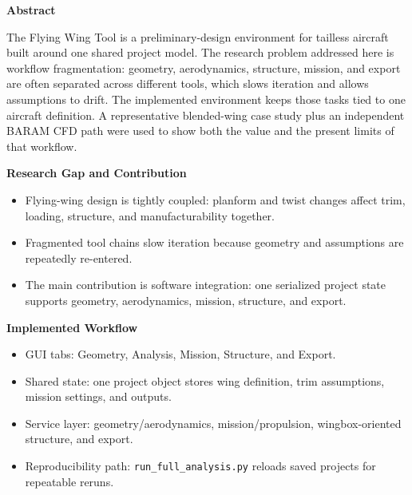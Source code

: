\documentclass[18pt]{extarticle}
\newcommand{\sectionbar}[1]{%
  \vspace{0.10\baselineskip}%
  \colorbox{prismblue}{%
    \parbox[c][0.78in][c]{\dimexpr\linewidth-2\fboxsep\relax}{%
      \hspace{0.35em}\color{white}\bfseries\fontsize{39}{43}\selectfont #1%
    }%
  }%
  \vspace{0.20\baselineskip}%
}
\begin{document}
\begin{minipage}[t]{0.335\linewidth}
  \vspace{0pt}
  \sectionbar{Abstract}
  The Flying Wing Tool is a preliminary-design environment for tailless aircraft built around one shared project model. The research problem addressed here is workflow fragmentation: geometry, aerodynamics, structure, mission, and export are often separated across different tools, which slows iteration and allows assumptions to drift. The implemented environment keeps those tasks tied to one aircraft definition. A representative blended-wing case study plus an independent BARAM CFD path were used to show both the value and the present limits of that workflow.

  \sectionbar{Research Gap and Contribution}
  \begin{itemize}
    \item Flying-wing design is tightly coupled: planform and twist changes affect trim, loading, structure, and manufacturability together.
    \item Fragmented tool chains slow iteration because geometry and assumptions are repeatedly re-entered.
    \item The main contribution is software integration: one serialized project state supports geometry, aerodynamics, mission, structure, and export.
  \end{itemize}

  \sectionbar{Implemented Workflow}
  \begin{itemize}
    \item GUI tabs: Geometry, Analysis, Mission, Structure, and Export.
    \item Shared state: one project object stores wing definition, trim assumptions, mission settings, and outputs.
    \item Service layer: geometry/aerodynamics, mission/propulsion, wingbox-oriented structure, and export.
    \item Reproducibility path: \texttt{run\_full\_analysis.py} reloads saved projects for repeatable reruns.
  \end{itemize}


\end{minipage}
\end{document}
